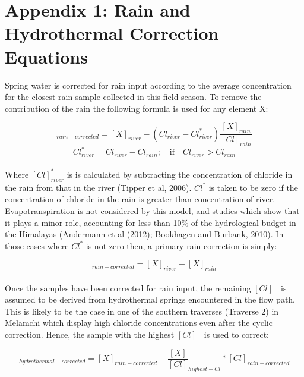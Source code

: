 

\section*{Appendix 1: Rain and Hydrothermal Correction Equations}


Spring water is corrected for rain input according to the average concentration for the closest rain sample collected in this field season. To remove the contribution of the rain the following formula is used for any element X:

\begin{equation}
    [X]_{rain-corrected}  = [X]_{river} - (Cl_{river} - Cl^*_{river})\frac{[X]_{rain}}{[Cl]_{rain}}
\end{equation}
\begin{equation}
    Cl^*_{river} = Cl_{river} - Cl_{rain}; \quad \text{if} \quad Cl_{river} > Cl_{rain}
\end{equation}\\
    

Where $[Cl]^*_{river}$ is is calculated by subtracting the concentration of chloride in the rain from that in the river (Tipper et al, 2006). $Cl^{*}$ is taken to be zero if the concentration of chloride in the rain is greater than concentration of river. Evapotranspiration is not considered by this model, and studies which show that it plays a minor role, accounting for less than 10\% of the hydrological budget in the Himalayas (Andermann et al (2012); Bookhagen and Burbank, 2010). In those cases where $Cl^*$ is not zero then, a primary rain correction is simply:

\begin{equation}
[X]_{rain-corrected}  = [X]_{river} - [X]_{rain}
\end{equation}\\

Once the samples have been corrected for rain input, the remaining $[Cl]^{-}$ is assumed to be derived from hydrothermal springs encountered in the flow path. This is likely to be the case in one of the southern traverses (Traverse 2) in Melamchi which display high chloride concentrations even after the cyclic correction. Hence, the sample with the highest $[Cl]^{-}$ is used to correct:

\begin{equation}
[X]_{hydrothermal-corrected}  = [X]_{rain-corrected} - \frac{[X]}{[Cl]}_{highest-Cl} * [Cl]_{rain-corrected}
\end{equation}\\

